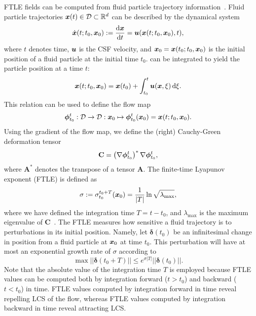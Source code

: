 \documentclass{template}
\begin{document}
FTLE fields can be computed from fluid particle trajectory information~\cite{shadden2005definition}.
Fluid particle trajectories $\bm{x}(t)\in\mathcal{D}\subset\mathbb{R}^d$
can be described by the dynamical system
\begin{equation}
    \dot{\bm{x}}(t; t_0, \bm{x}_0) := \frac{\mathrm d\bm{x}}{\mathrm d t} = \bm{u}(\bm{x}(t; t_0, \bm{x}_0), t),
    \label{eq:dx_dt_equals_u}
\end{equation}
where $t$ denotes time, $\bm{u}$ is the CSF velocity, and $\bm{x}_0=\bm{x}(t_0; t_0, \bm{x}_0)$
is the initial position of a fluid particle at the initial time $t_0$. 
 can be integrated to yield the particle position at a time
$t$:
\begin{equation}
    \bm{x}(t; t_0, \bm{x}_0) = \bm{x}(t_0) + \int_{t_0}^t \bm{u}(\bm{x}, \xi)\,\mathrm d\xi.
    \label{eq:integrate_dx_dt}
\end{equation}
This relation can be used to define the flow map
\begin{equation}
    \bm{\phi}_{t_0}^t : \mathcal{D} \rightarrow \mathcal{D} : \bm{x}_0 \mapsto \bm{\phi}_{t_0}^t(\bm{x}_0) = \bm{x}(t; t_0, \bm{x}_0).
\end{equation}
Using the gradient of the flow map,
we define the (right) Cauchy-Green deformation tensor
\begin{equation}
    \mathbf{C} = \left(\nabla\bm{\phi}_{t_0}^t\right)^*\nabla\bm{\phi}_{t_0}^t,
\end{equation}
where $\mathbf{A}^*$ denotes the transpose of a tensor $\mathbf{A}$.
The finite-time Lyapunov exponent (FTLE) is defined as
\begin{equation}
    \sigma:=\sigma_{t_0}^{t_0+T}(\bm{x}_0) = \frac{1}{\vert T\vert}\ln{\sqrt{\lambda_{\mathrm{max}}}},
\end{equation}
where we have defined the integration time $T = t - t_0$, and $\lambda_{\mathrm{max}}$
is the maximum eigenvalue of $\mathbf{C}$~\cite{shadden2005definition}.
The FTLE measures how sensitive a fluid trajectory
is to perturbations in its initial position.
Namely, let $\boldsymbol{\delta}(t_0)$ be an infinitesimal change
in position from a fluid particle at $\bm{x}_0$ at time $t_0$.
This perturbation will have at most an exponential growth
rate of $\sigma$ according to~\cite{shadden2008characterization}
\begin{equation}
    \max||\boldsymbol{\delta}(t_0 + T)||
    \leq e^{\sigma |T|}||\boldsymbol{\delta}(t_0)||.
\end{equation}
Note that the absolute value of the integration time $T$
is employed because FTLE values can be computed
both by integration forward ($t>t_0$) and backward ($t<t_0$) in time.
FTLE values computed by integration forward in time
reveal repelling LCS of the flow,
whereas FTLE values computed by integration backward in time 
reveal attracting LCS. 
\end{document}
